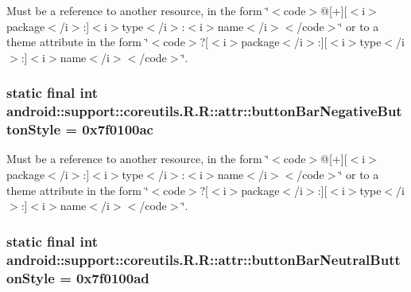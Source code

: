 Must be a reference to another resource, in the form \char`\"{}$<$code$>$@\mbox{[}+\mbox{]}\mbox{[}$<$i$>$package$<$/i$>$:\mbox{]}$<$i$>$type$<$/i$>$:$<$i$>$name$<$/i$>$$<$/code$>$\char`\"{} or to a theme attribute in the form \char`\"{}$<$code$>$?\mbox{[}$<$i$>$package$<$/i$>$:\mbox{]}\mbox{[}$<$i$>$type$<$/i$>$:\mbox{]}$<$i$>$name$<$/i$>$$<$/code$>$\char`\"{}. \hypertarget{classandroid_1_1support_1_1coreutils_1_1_r_1_1attr_034456267790a4a8d4d0e78c4e406a59}{
\subsubsection[{buttonBarNegativeButtonStyle}]{\setlength{\rightskip}{0pt plus 5cm}static final int android::support::coreutils.R.R::attr::buttonBarNegativeButtonStyle = 0x7f0100ac}}
\label{classandroid_1_1support_1_1coreutils_1_1_r_1_1attr_034456267790a4a8d4d0e78c4e406a59}


Must be a reference to another resource, in the form \char`\"{}$<$code$>$@\mbox{[}+\mbox{]}\mbox{[}$<$i$>$package$<$/i$>$:\mbox{]}$<$i$>$type$<$/i$>$:$<$i$>$name$<$/i$>$$<$/code$>$\char`\"{} or to a theme attribute in the form \char`\"{}$<$code$>$?\mbox{[}$<$i$>$package$<$/i$>$:\mbox{]}\mbox{[}$<$i$>$type$<$/i$>$:\mbox{]}$<$i$>$name$<$/i$>$$<$/code$>$\char`\"{}. \hypertarget{classandroid_1_1support_1_1coreutils_1_1_r_1_1attr_6b02280b4e57e1df8d0382afaa2c5010}{
\subsubsection[{buttonBarNeutralButtonStyle}]{\setlength{\rightskip}{0pt plus 5cm}static final int android::support::coreutils.R.R::attr::buttonBarNeutralButtonStyle = 0x7f0100ad}}
\label{classandroid_1_1support_1_1coreutils_1_1_r_1_1attr_6b02280b4e57e1df8d0382afaa2c5010}


